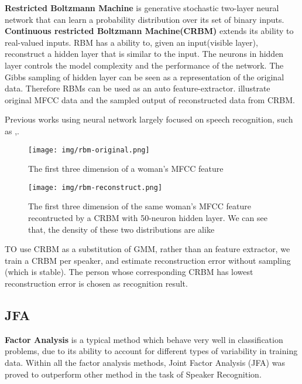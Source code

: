 \textbf{Restricted Boltzmann Machine} is generative stochastic
two-layer neural network that can learn a probability distribution
over its set of binary inputs\cite{rbm_wiki}.  \textbf{Continuous
restricted Boltzmann Machine(CRBM)}\cite{chen2003continuous} extends
its ability to real-valued inputs.  RBM has a ability to, given an
input(visible layer), reconstruct a hidden layer that is similar
to the input.  The neurons
in hidden layer controls the model complexity and the performance of
the network. The Gibbs sampling of hidden layer can be seen as a
representation of the original data. Therefore RBMs can be used
as an auto feature-extractor.
 illustrate original MFCC data and the
sampled output of reconstructed data from CRBM.

Previous works using neural network largely focused on speech
recognition, such as \cite{deep},\cite{mohamed2011deep}.

\begin{figure}[H]
  \begin{minipage}{0.48\linewidth}
    \centering
    \texttt{[image: img/rbm-original.png]}
    \caption*{The first three dimension of a woman's MFCC feature}
  \end{minipage}
  \hfill
  \begin{minipage}{0.48\linewidth}
    \centering
    \texttt{[image: img/rbm-reconstruct.png]}
    \caption*{The first three dimension of the same woman's MFCC feature
      recontructed by a CRBM with 50-neuron hidden layer. We can
      see that, the density of these two distributions are alike}
  \end{minipage}
  \caption{\label{fig:crbm}}
\end{figure}

TO use CRBM as a substitution of GMM, rather than
an feature extractor, we train a CRBM per speaker,
and estimate reconstruction error without sampling (which is stable).
The person whose corresponding CRBM has lowest reconstruction error is chosen as
recognition result.

\subsection{JFA}

\textbf{Factor Analysis} is a typical method which behave
very well in classification problems, due to its ability to
account for different types of variability in training data.
Within all the factor analysis methods,
Joint Factor Analysis (JFA)\cite{jfa2,jfa-se} was proved to outperform other method
in the task of Speaker Recognition.


